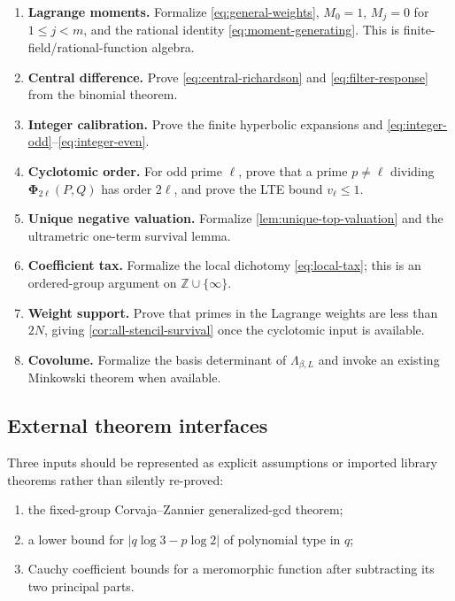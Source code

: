 \documentclass[11pt]{article}
\theoremstyle{definition}
\newcommand{\Z}{\mathbb Z}
\newcommand{\PhiHom}{\boldsymbol\Phi}
\begin{document}
\begin{enumerate}[leftmargin=*,itemsep=5pt]
\item \textbf{Lagrange moments.}  Formalize \eqref{eq:general-weights},
$M_0=1$, $M_j=0$ for $1\le j<m$, and the rational identity
\eqref{eq:moment-generating}.  This is finite-field/rational-function algebra.
\item \textbf{Central difference.}  Prove \eqref{eq:central-richardson} and
\eqref{eq:filter-response} from the binomial theorem.
\item \textbf{Integer calibration.}  Prove the finite hyperbolic expansions
and \eqref{eq:integer-odd}--\eqref{eq:integer-even}.
\item \textbf{Cyclotomic order.}  For odd prime $\ell$, prove that a prime
$p\ne\ell$ dividing $\PhiHom_{2\ell}(P,Q)$ has order $2\ell$, and prove the
LTE bound $v_\ell\le1$.
\item \textbf{Unique negative valuation.}  Formalize
\cref{lem:unique-top-valuation} and the ultrametric one-term survival lemma.
\item \textbf{Coefficient tax.}  Formalize the local dichotomy
\eqref{eq:local-tax}; this is an ordered-group argument on $\Z\cup\{\infty\}$.
\item \textbf{Weight support.}  Prove that primes in the Lagrange weights are
less than $2N$, giving \cref{cor:all-stencil-survival} once the cyclotomic
input is available.
\item \textbf{Covolume.}  Formalize the basis determinant of
$\Lambda_{\beta,L}$ and invoke an existing Minkowski theorem when available.
\end{enumerate}

\subsection{External theorem interfaces}

Three inputs should be represented as explicit assumptions or imported
library theorems rather than silently re-proved:

\begin{enumerate}[leftmargin=*,itemsep=4pt]
\item the fixed-group Corvaja--Zannier generalized-gcd theorem;
\item a lower bound for $|q\log3-p\log2|$ of polynomial type in $q$;
\item Cauchy coefficient bounds for a meromorphic function after subtracting
its two principal parts.
\end{enumerate}
\end{document}
